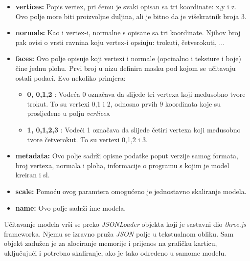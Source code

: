 \begin{itemize}
\item \textbf{vertices:} Popis vertex, pri čemu je svaki opisan sa tri koordinate: x,y i z. Ovo polje more biti proizvoljne duljina, ali je bitno da je višekratnik broja 3.

\item \textbf{normals:} Kao i vertex-i, normalne s opisane sa tri koordinate. Njihov broj pak ovisi o vrsti ravnina koju vertex-i opsiuju: trokuti, četverokuti, ...

\item \textbf{faces:} Ovo polje opisuje koji vertexi i normale (opcinalno i teksture i boje) čine jednu plohu. Prvi broj u nizu definira masku pod kojom se učitavaju ostali podaci. Evo nekoliko primjera:

\begin{itemize}

\item \textbf{0, 0,1,2} : Vodeća 0 označava da slijede tri vertexa koji međusobno tvore trokut. To su vertexi 0,1 i 2, odnosno prvih 9 koordinata koje su prosljeđene u polju \emph{vertices}.

\item \textbf{1, 0,1,2,3} : Vodeći 1 označava da slijede četiri vertexa koji međusobno tvore četverokut. To su vertexi 0,1,2 i 3.
\end{itemize}

\item \textbf{metadata:} Ovo polje sadrži opisne podatke poput verzije samog formata, broj vertexa, normala i ploha, informacije o programu s kojim je model kreiran i sl.

\item \textbf{scale:} Pomoću ovog paramtera omogućeno je jednostavno skaliranje modela.

\item \textbf{name:} Ovo polje sadrži ime modela.

\end{itemize}

Učitavanje modela vrši se preko \emph{JSONLoader} objekta koji je sastavni dio \emph{three.js} frameworka. Njemu se izravno pruža \emph{JSON} polje u tekstualnom obliku. Sam objekt zadužen je za alociranje memorije i prijenos na grafičku karticu, uključujući i potrebno skaliranje, ako je tako određeno u samome modelu.